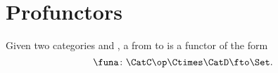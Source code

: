 

\section{Profunctors}

\begin{ctdefinition}[Profunctor]
  \label{def:profunctor}
  Given two categories \CatC and \CatD, a \emph{} from \CatC to \CatD is a functor of the form
  \begin{equation}
    \funa\colon \CatC\op \Ctimes \CatD \fto \Set.
  \end{equation}
\end{ctdefinition}

